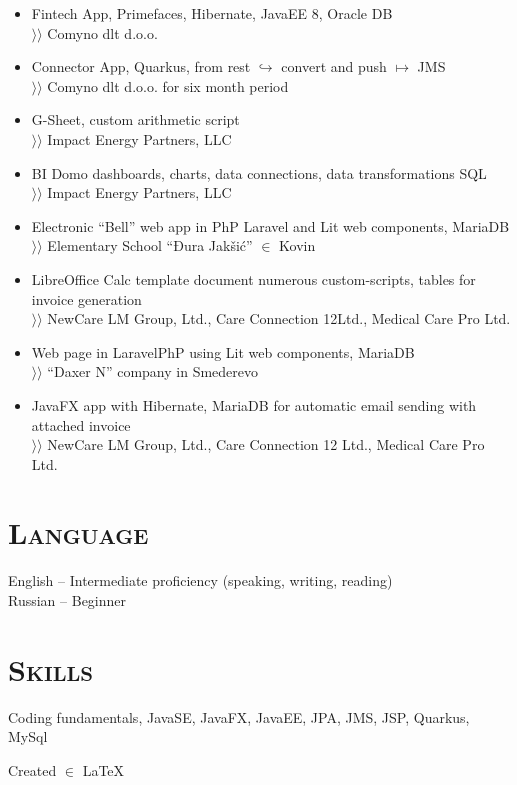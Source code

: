 \documentclass{article}
\begin{document}
\begin{itemize}
  
\item  Fintech App, Primefaces, Hibernate, JavaEE 8, Oracle DB\\
$\rangle\!\rangle$ Comyno dlt d.o.o.
\item Connector App, Quarkus, from rest $\hookrightarrow$ convert and push $\mapsto$ JMS\\
$\rangle\!\rangle$ Comyno dlt d.o.o. for six month period
\item G-Sheet, custom arithmetic script\\
$\rangle\!\rangle$ Impact Energy Partners, LLC
\item BI Domo dashboards, charts, data connections, data transformations SQL\\
$\rangle\!\rangle$ Impact Energy Partners, LLC
\item Electronic ``Bell'' web app in PhP Laravel and Lit web components, MariaDB\\
$\rangle\!\rangle$ Elementary School ``Đura Jakšić''  $\in$ Kovin
\item LibreOffice Calc template document numerous custom-scripts, tables for invoice generation\\ 
$\rangle\!\rangle$ NewCare LM Group, Ltd., Care Connection 12Ltd., Medical Care Pro Ltd.
\item Web page in LaravelPhP using Lit web components, MariaDB\\
$\rangle\!\rangle$ ``Daxer N'' company in Smederevo
\item JavaFX app with Hibernate, MariaDB for automatic email sending with attached invoice\\
$\rangle\!\rangle$ NewCare LM Group, Ltd., Care Connection 12 Ltd., Medical Care Pro Ltd.
\end{itemize}

\section{\textsc{Language}}

English  -- Intermediate proficiency (speaking, writing, reading)\\
Russian -- Beginner

\section{\textsc{Skills}}

Coding fundamentals, JavaSE, JavaFX, JavaEE, JPA, JMS, JSP,  Quarkus, MySql

\vfill
\raggedleft \small Created $\in$ \LaTeX 
\hfill
\longdate{}
\end{document}
